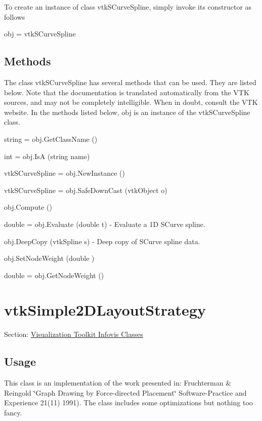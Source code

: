 To create an instance of class vtk\-S\-Curve\-Spline, simply invoke its constructor as follows \begin{DoxyVerb}  obj = vtkSCurveSpline
\end{DoxyVerb}
 \hypertarget{vtkwidgets_vtkxyplotwidget_Methods}{}\subsection{Methods}\label{vtkwidgets_vtkxyplotwidget_Methods}
The class vtk\-S\-Curve\-Spline has several methods that can be used. They are listed below. Note that the documentation is translated automatically from the V\-T\-K sources, and may not be completely intelligible. When in doubt, consult the V\-T\-K website. In the methods listed below, {\ttfamily obj} is an instance of the vtk\-S\-Curve\-Spline class. 
\begin{DoxyItemize}
\item {\ttfamily string = obj.\-Get\-Class\-Name ()}  
\item {\ttfamily int = obj.\-Is\-A (string name)}  
\item {\ttfamily vtk\-S\-Curve\-Spline = obj.\-New\-Instance ()}  
\item {\ttfamily vtk\-S\-Curve\-Spline = obj.\-Safe\-Down\-Cast (vtk\-Object o)}  
\item {\ttfamily obj.\-Compute ()}  
\item {\ttfamily double = obj.\-Evaluate (double t)} -\/ Evaluate a 1\-D S\-Curve spline.  
\item {\ttfamily obj.\-Deep\-Copy (vtk\-Spline s)} -\/ Deep copy of S\-Curve spline data.  
\item {\ttfamily obj.\-Set\-Node\-Weight (double )}  
\item {\ttfamily double = obj.\-Get\-Node\-Weight ()}  
\end{DoxyItemize}\hypertarget{vtkinfovis_vtksimple2dlayoutstrategy}{}\section{vtk\-Simple2\-D\-Layout\-Strategy}\label{vtkinfovis_vtksimple2dlayoutstrategy}
Section\-: \hyperlink{sec_vtkinfovis}{Visualization Toolkit Infovis Classes} \hypertarget{vtkwidgets_vtkxyplotwidget_Usage}{}\subsection{Usage}\label{vtkwidgets_vtkxyplotwidget_Usage}
This class is an implementation of the work presented in\-: Fruchterman \& Reingold \char`\"{}\-Graph Drawing by Force-\/directed Placement\char`\"{} Software-\/\-Practice and Experience 21(11) 1991). The class includes some optimizations but nothing too fancy.

